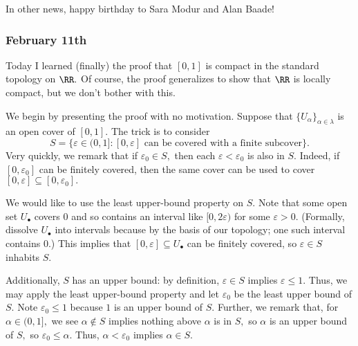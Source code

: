 In other news, happy birthday to Sara Modur and Alan Baade!

\subsubsection{February 11th}
Today I learned (finally) the proof that $[0,1]$ is compact in the standard topology on $\RR.$ Of course, the proof generalizes to show that $\RR$ is locally compact, but we don't bother with this.

We begin by presenting the proof with no motivation. Suppose that $\{U_\alpha\}_{\alpha\in\lambda}$ is an open cover of $[0,1].$ The trick is to consider
\[S=\{\varepsilon\in(0,1]:[0,\varepsilon]\text{ can be covered with a finite subcover}\}.\]
Very quickly, we remark that if $\varepsilon_0\in S,$ then each $\varepsilon<\varepsilon_0$ is also in $S.$ Indeed, if $[0,\varepsilon_0]$ can be finitely covered, then the same cover can be used to cover $[0,\varepsilon]\subseteq[0,\varepsilon_0].$

We would like to use the least upper-bound property on $S.$ Note that some open set $U_\bullet$ covers $0$ and so contains an interval like $[0,2\varepsilon)$ for some $\varepsilon>0.$ (Formally, dissolve $U_\bullet$ into intervals because by the basis of our topology; one such interval contains $0.$) This implies that $[0,\varepsilon]\subseteq U_\bullet$ can be finitely covered, so $\varepsilon\in S$ inhabits $S.$

Additionally, $S$ has an upper bound: by definition, $\varepsilon\in S$ implies $\varepsilon\le1.$ Thus, we may apply the least upper-bound property and let $\varepsilon_0$ be the least upper bound of $S.$ Note $\varepsilon_0\le1$ because $1$ is an upper bound of $S.$ Further, we remark that, for $\alpha\in(0,1],$ we see $\alpha\not\in S$ implies nothing above $\alpha$ is in $S,$ so $\alpha$ is an upper bound of $S,$ so $\varepsilon_0\le\alpha.$ Thus, $\alpha<\varepsilon_0$ implies $\alpha\in S.$

